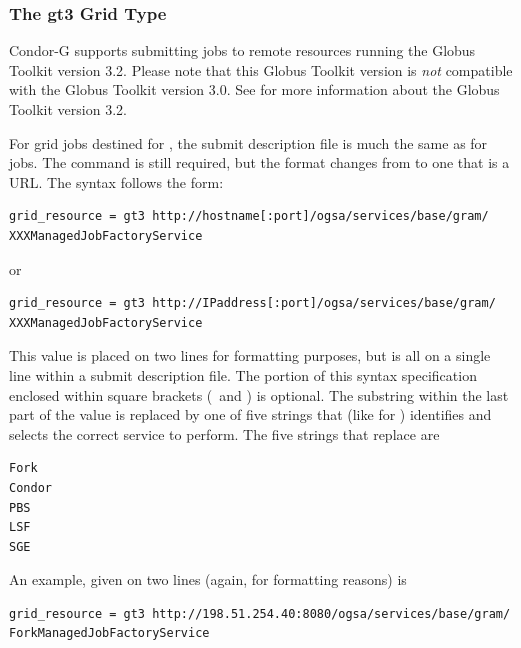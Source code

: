 \subsubsection{\label{sec:Using-gt3}The gt3 Grid Type}

Condor-G supports submitting jobs to remote resources running
the Globus Toolkit version 3.2.
Please note that this Globus Toolkit version
is \emph{not} compatible with the Globus Toolkit version 3.0.
See
for more information about the Globus Toolkit version 3.2.

For grid jobs destined for ,
the submit description file is much the same as for
 jobs.
The  command is still required,
but the format changes from 
to one that is a URL. 
The syntax follows the form:
\footnotesize
\begin{verbatim}
grid_resource = gt3 http://hostname[:port]/ogsa/services/base/gram/
XXXManagedJobFactoryService
\end{verbatim}
\normalsize

or
\footnotesize
\begin{verbatim}
grid_resource = gt3 http://IPaddress[:port]/ogsa/services/base/gram/
XXXManagedJobFactoryService
\end{verbatim}
\normalsize

This value is placed on two lines for
formatting purposes, but is all on a single line within
a submit description file.
The portion of this syntax specification enclosed within
square brackets (\Lbr\ and \Rbr) is optional.
The substring \verb@XXX@ within the last part of the value
is replaced by one of five strings that (like for 
) identifies and selects the correct service to perform.
The five strings that replace \verb@XXX@ are
\begin{verbatim}
Fork
Condor
PBS
LSF
SGE
\end{verbatim}


An example, given on two lines (again, for formatting reasons) is 
\footnotesize
\begin{verbatim}
grid_resource = gt3 http://198.51.254.40:8080/ogsa/services/base/gram/
ForkManagedJobFactoryService
\end{verbatim}
\normalsize


